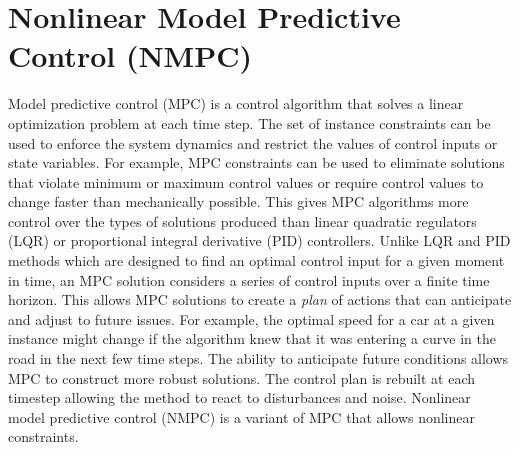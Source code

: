 \documentclass[]{article}
\newcommand{\mpc}{MPC}
\newcommand{\nmpc}{NMPC}
\begin{document}
	


\section*{Nonlinear Model Predictive Control (NMPC)}

Model predictive control (\mpc) is a control algorithm that solves a linear optimization problem at each time step. 
The set of instance constraints can be used to enforce the system dynamics and restrict the values of control inputs or state variables.  For example, {\mpc} constraints can be used to eliminate solutions that violate minimum or maximum control values or require control values to change faster than mechanically possible.  This gives {\mpc} algorithms more control over the types of solutions produced than linear quadratic regulators (LQR) or proportional integral derivative (PID) controllers.  
Unlike LQR and PID methods which are designed to find an optimal control input for a given moment in time, an {\mpc} solution considers a series of control inputs over a finite time horizon.  This allows {\mpc} solutions to create a {\em plan} of actions that can anticipate and adjust to future issues. For example, the optimal speed for a car at a given instance might change if the algorithm knew that it was entering a curve in the road in the next few time steps.
The ability to anticipate future conditions allows {\mpc} to construct more robust solutions. The control plan is rebuilt at each timestep allowing the method to react to disturbances and noise.
Nonlinear model predictive control (\nmpc) is a variant of {\mpc} that allows nonlinear constraints. 
\end{document}
